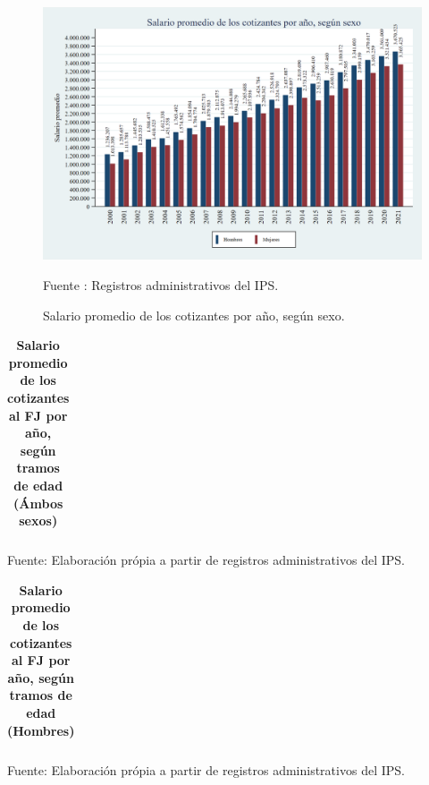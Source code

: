 \begin{figure}[H]
\begin{center}
                    \caption{Salario promedio de los cotizantes por año, según sexo.}
                    \includegraphics[scale=0.35]{RA_IPS_cotizaciones_2010a2020_year_almenos_salprom_by_sex}
                                    \item \footnotesize Fuente : Registros administrativos del IPS. 
                    \end{center}
\end{figure}

\begin{table}[H]
\begin{center}
\scriptsize     
\caption{\bf{Salario promedio de los cotizantes al FJ por año, según tramos de edad (Ámbos sexos)}}
\begin{tabular}{l|rrrrrrrrrrrrr}

\end{tabular}
                    \item Fuente: Elaboración própia a partir de registros administrativos del IPS.
\end{center}
\end{table}

\begin{table}[H]
\begin{center}
\scriptsize     
\caption{\bf{Salario promedio de los cotizantes al FJ por año, según tramos de edad (Hombres) }}
\begin{tabular}{l|rrrrrrrrrrrrr}

\end{tabular}
                    \item Fuente: Elaboración própia a partir de registros administrativos del IPS.
\end{center}
\end{table}

